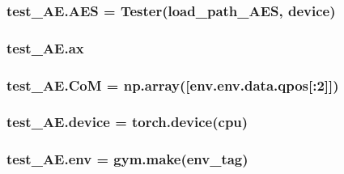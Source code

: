 \subsubsection[{\texorpdfstring{A\+ES}{AES}}]{\setlength{\rightskip}{0pt plus 5cm}test\+\_\+\+A\+E.\+A\+ES = {\bf Tester}({\bf load\+\_\+path\+\_\+\+A\+ES}, {\bf device})}\hypertarget{namespacetest___a_e_afe4816898ea861698a2f82d4443c9f9b}{}\label{namespacetest___a_e_afe4816898ea861698a2f82d4443c9f9b}
\subsubsection[{\texorpdfstring{ax}{ax}}]{\setlength{\rightskip}{0pt plus 5cm}test\+\_\+\+A\+E.\+ax}\hypertarget{namespacetest___a_e_a29ea1dd7415edda21580b999e726a456}{}\label{namespacetest___a_e_a29ea1dd7415edda21580b999e726a456}
\subsubsection[{\texorpdfstring{CoM}{CoM}}]{\setlength{\rightskip}{0pt plus 5cm}test\+\_\+\+A\+E.\+CoM = np.\+array(\mbox{[}env.\+env.\+data.\+qpos\mbox{[}\+:2\mbox{]}\mbox{]})}\hypertarget{namespacetest___a_e_a231bc404e8f52fb98deb7b2dd6c089ae}{}\label{namespacetest___a_e_a231bc404e8f52fb98deb7b2dd6c089ae}
\subsubsection[{\texorpdfstring{device}{device}}]{\setlength{\rightskip}{0pt plus 5cm}test\+\_\+\+A\+E.\+device = torch.\+device(\textquotesingle{}cpu\textquotesingle{})}\hypertarget{namespacetest___a_e_a2fe4876a8ef1d5961b3a7238a439bed4}{}\label{namespacetest___a_e_a2fe4876a8ef1d5961b3a7238a439bed4}
\subsubsection[{\texorpdfstring{env}{env}}]{\setlength{\rightskip}{0pt plus 5cm}test\+\_\+\+A\+E.\+env = gym.\+make({\bf env\+\_\+tag})}\hypertarget{namespacetest___a_e_ab93732fc273273ff522687d5beb1907c}{}\label{namespacetest___a_e_ab93732fc273273ff522687d5beb1907c}
